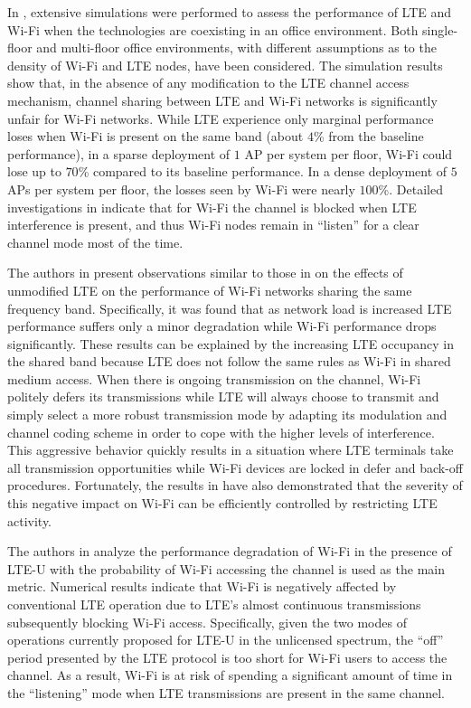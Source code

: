 In \cite{original-LTE-Wi-Fi-VTC-2013}, extensive simulations were performed to assess the performance of LTE and \mbox{Wi-Fi} when the technologies are coexisting in an office environment. Both single-floor and multi-floor office environments, with different assumptions as to the density of \mbox{Wi-Fi} and LTE nodes, have been considered. The simulation results show that, in the absence of any modification to the LTE channel access mechanism, channel sharing between LTE and \mbox{Wi-Fi} networks is significantly unfair for \mbox{Wi-Fi} networks. While LTE experience only marginal performance loses when \mbox{Wi-Fi} is present on the same band (about $4$\% from the baseline performance), in a sparse deployment of $1$ AP per system per floor, \mbox{Wi-Fi} could lose up to $70$\% compared to its baseline performance.  In a dense deployment of $5$ APs per system per floor, the losses seen by \mbox{Wi-Fi} were nearly $100$\%. Detailed investigations in \cite{original-LTE-Wi-Fi-VTC-2013} indicate that for \mbox{Wi-Fi} the channel is blocked when LTE interference is present, and thus \mbox{Wi-Fi} nodes remain in ``listen'' for a clear channel mode most of the time.

The authors in \cite{original-LTE-Wi-Fi-WCNC-2013} present observations similar to those in \cite{original-LTE-Wi-Fi-VTC-2013} on the effects of unmodified LTE on the performance of \mbox{Wi-Fi} networks sharing the same frequency band. Specifically, it was found that as network load is increased LTE performance suffers only a minor degradation while \mbox{Wi-Fi} performance drops significantly. These results can be explained by the increasing LTE occupancy in the shared band because LTE does not follow the same rules as \mbox{Wi-Fi} in shared medium access. When there is ongoing transmission on the channel, \mbox{Wi-Fi} politely defers its transmissions while LTE will always choose to transmit and simply select a more robust transmission mode by adapting its modulation and channel coding scheme in order to cope with the higher levels of interference. This aggressive behavior quickly results in a situation where LTE terminals take all transmission opportunities while \mbox{Wi-Fi} devices are locked in defer and back-off procedures. Fortunately, the results in \cite{original-LTE-Wi-Fi-WCNC-2013} have also demonstrated that the severity of this negative impact on \mbox{Wi-Fi} can be efficiently controlled by restricting LTE activity.

The authors in \cite{LTE-U-PIMRC-2014} analyze the performance degradation of \mbox{Wi-Fi} in the presence of \mbox{LTE-U} with the probability of \mbox{Wi-Fi} accessing the channel is used as the main metric. Numerical results indicate that \mbox{Wi-Fi} is negatively affected by conventional LTE operation due to LTE's almost continuous transmissions subsequently blocking \mbox{Wi-Fi} access. Specifically, given the two modes of operations currently proposed for \mbox{LTE-U} in the unlicensed spectrum, the ``off'' period presented by the LTE protocol is too short for \mbox{Wi-Fi} users to access the channel. As a result, \mbox{Wi-Fi} is at risk of spending a significant amount of time in the ``listening'' mode when LTE transmissions are present in the same channel.

